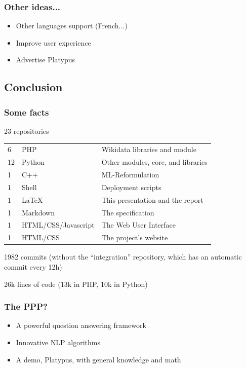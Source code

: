 \begin{frame}
    \frametitle{Other ideas...}

    \begin{itemize}
        \item Other languages support (French...)
        \item Improve user experience
        \item Advertise \alert{Platypus}
    \end{itemize}
\end{frame}

\subsection{Conclusion}

\begin{frame}
    \frametitle{Some facts} %
    \alert{23 repositories}

    \begin{tabular}{lll}
        6 & PHP & Wikidata libraries and module\\
        12 & Python & Other modules, core, and libraries\\
        1 & C++ & ML-Reformulation\\
        1 & Shell & Deployment scripts\\
        1 & \LaTeX & This presentation and the report\\
        1 & Markdown & The specification\\
        1 & HTML/CSS/Javascript & The Web User Interface\\
        1 & HTML/CSS & The project's website\\
    \end{tabular}

    \alert{1982 commits} (without the ``integration'' repository, which has an automatic commit every 12h)

    \alert{26k lines} of code (13k in PHP, 10k in Python)
\end{frame}

\begin{frame}
    \frametitle{The PPP?}

    \begin{itemize}
        \item A powerful question answering framework
        \item Innovative NLP algorithms
        \item A demo, \alert{Platypus}, with general knowledge and math
    \end{itemize}
\end{frame}


